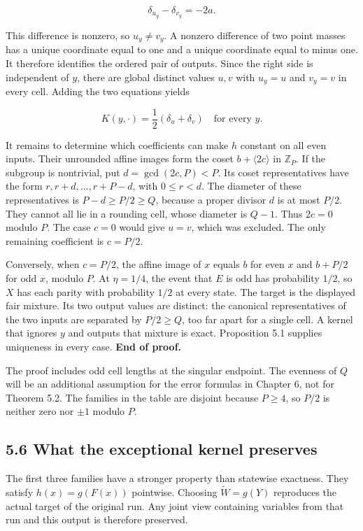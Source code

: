 \documentclass[
]{article}
\begin{document}
\[
\delta_{u_y}-\delta_{v_y}=-2a.
\]

This difference is nonzero, so \(u_y\ne v_y\). A nonzero difference of
two point masses has a unique coordinate equal to one and a unique
coordinate equal to minus one. It therefore identifies the ordered pair
of outputs. Since the right side is independent of \(y\), there are
global distinct values \(u,v\) with \(u_y=u\) and \(v_y=v\) in every
cell. Adding the two equations yields

\[
K(y,\cdot)=\frac12(\delta_u+\delta_v)
\quad\text{for every }y.
\]

It remains to determine which coefficients can make \(h\) constant on
all even inputs. Their unrounded affine images form the coset
\(b+\langle2c\rangle\) in \(\mathbb Z_P\). If the subgroup is
nontrivial, put \(d=\gcd(2c,P)<P\). Its coset representatives have the
form \(r,r+d,\ldots,r+P-d\), with \(0\le r<d\). The diameter of these
representatives is \(P-d\ge P/2\ge Q\), because a proper divisor \(d\)
is at most \(P/2\). They cannot all lie in a rounding cell, whose
diameter is \(Q-1\). Thus \(2c=0\) modulo \(P\). The case \(c=0\) would
give \(u=v\), which was excluded. The only remaining coefficient is
\(c=P/2\).

Conversely, when \(c=P/2\), the affine image of \(x\) equals \(b\) for
even \(x\) and \(b+P/2\) for odd \(x\), modulo \(P\). At \(\eta=1/4\),
the event that \(E\) is odd has probability \(1/2\), so \(X\) has each
parity with probability \(1/2\) at every state. The target is the
displayed fair mixture. Its two output values are distinct: the
canonical representatives of the two inputs are separated by
\(P/2\ge Q\), too far apart for a single cell. A kernel that ignores
\(y\) and outputs that mixture is exact. Proposition 5.1 supplies
uniqueness in every case. \textbf{End of proof.}

The proof includes odd cell lengths at the singular endpoint. The
evenness of \(Q\) will be an additional assumption for the error
formulas in Chapter 6, not for Theorem 5.2. The families in the table
are disjoint because \(P\ge4\), so \(P/2\) is neither zero nor \(\pm1\)
modulo \(P\).

\subsection{5.6 What the exceptional kernel
preserves}\label{what-the-exceptional-kernel-preserves}

The first three families have a stronger property than statewise
exactness. They satisfy \(h(x)=g(F(x))\) pointwise. Choosing
\(\widetilde W=g(Y)\) reproduces the actual target of the original run.
Any joint view containing variables from that run and this output is
therefore preserved.
\end{document}
